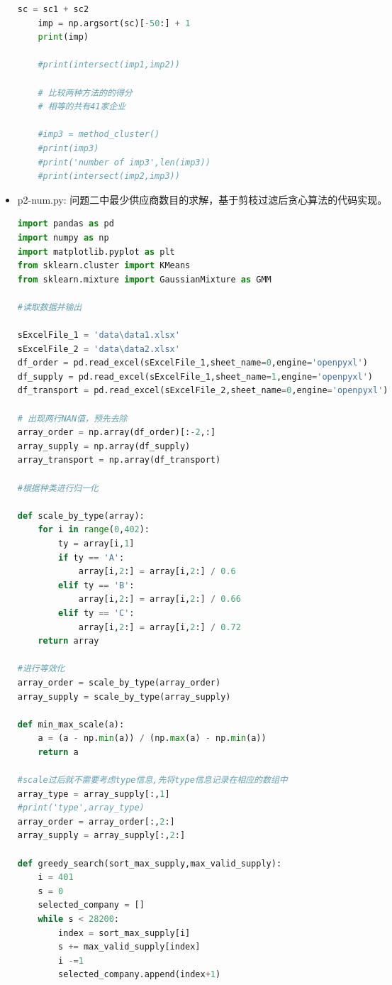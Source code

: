 \documentclass{my_paper}
\begin{document}
\begin{itemize}
\begin{lstlisting}[language={Python}]
    sc = sc1 + sc2 
    imp = np.argsort(sc)[-50:] + 1
    print(imp)
    
    #print(intersect(imp1,imp2))

    # 比较两种方法的的得分
    # 相等的共有41家企业

    #imp3 = method_cluster()
    #print(imp3)
    #print('number of imp3',len(imp3))
    #print(intersect(imp2,imp3))

		\end{lstlisting}

\item p2-num.py: 问题二中最少供应商数目的求解，基于剪枝过滤后贪心算法的代码实现。

\begin{lstlisting}[language={Python}]
import pandas as pd 
import numpy as np
import matplotlib.pyplot as plt 
from sklearn.cluster import KMeans
from sklearn.mixture import GaussianMixture as GMM

#读取数据并输出

sExcelFile_1 = 'data\data1.xlsx'
sExcelFile_2 = 'data\data2.xlsx'
df_order = pd.read_excel(sExcelFile_1,sheet_name=0,engine='openpyxl')
df_supply = pd.read_excel(sExcelFile_1,sheet_name=1,engine='openpyxl')
df_transport = pd.read_excel(sExcelFile_2,sheet_name=0,engine='openpyxl')

# 出现两行NAN值，预先去除
array_order = np.array(df_order)[:-2,:]
array_supply = np.array(df_supply)
array_transport = np.array(df_transport)

#根据种类进行归一化

def scale_by_type(array):
    for i in range(0,402):
        ty = array[i,1]
        if ty == 'A':
            array[i,2:] = array[i,2:] / 0.6
        elif ty == 'B':
            array[i,2:] = array[i,2:] / 0.66
        elif ty == 'C':
            array[i,2:] = array[i,2:] / 0.72
    return array

#进行等效化
array_order = scale_by_type(array_order)
array_supply = scale_by_type(array_supply)

def min_max_scale(a):
    a = (a - np.min(a)) / (np.max(a) - np.min(a))
    return a 

#scale过后就不需要考虑type信息,先将type信息记录在相应的数组中
array_type = array_supply[:,1]
#print('type',array_type)
array_order = array_order[:,2:]
array_supply = array_supply[:,2:]

def greedy_search(sort_max_supply,max_valid_supply):
    i = 401
    s = 0
    selected_company = []
    while s < 28200:
        index = sort_max_supply[i]
        s += max_valid_supply[index]
        i -=1 
        selected_company.append(index+1)


\end{lstlisting}
\end{itemize}
\end{document}
